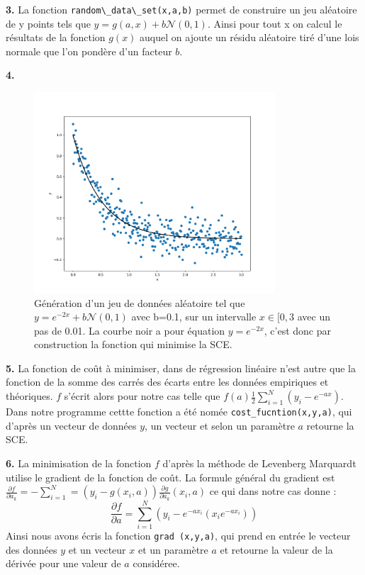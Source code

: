 \documentclass[12pt]{article}
\begin{document}
\textbf{\color{brick}3.} La fonction \verb|random\_data\_set(x,a,b)| permet de construire un jeu aléatoire de y points tels que  $y= g(a,x) +b \mathcal{N}(0,1)$. Ainsi pour tout x on calcul le résultats de la fonction $g(x)$ auquel on ajoute un résidu aléatoire tiré d'une lois normale que l'on pondère d'un facteur $b$.
\newpage

\textbf{\color{brick}4.} 
\begin{figure}[H]
\centering
\includegraphics[width=0.8\textwidth]{Q4.png}
\caption{Génération d'un jeu de données aléatoire tel que $y= e^{-2x} + b \mathcal{N}(0,1) $ avec b=0.1, sur un intervalle $x\in[0,3$ avec un pas de 0.01. La courbe noir a pour équation $y= e^{-2x}$, c'est donc par construction la fonction qui minimise la SCE. }
\label{Fig1}
\end{figure}

\textbf{\color{brick}5.} La fonction de coût à minimiser, dans de régression linéaire n'est autre que la fonction de la somme des carrés des écarts entre les données empiriques et théoriques. $f$ s'écrit alors  pour notre cas telle que $f(a) \frac{1}{2}\sum_{i=1}^N(y_i - e^{-ax}) $.  Dans notre programme cettte fonction a été nomée \verb|cost_fucntion(x,y,a)|, qui d'après un vecteur de données $y$, un vecteur et selon un paramètre $a$ retourne la SCE.


\textbf{\color{brick}6.} La minimisation de la fonction $f$ d'après la méthode de Levenberg Marquardt utilise le gradient de la fonction de coût. La formule général du gradient est \\
$\frac{\partial f}{\partial a_k} = - \sum_{i=1}^N = (y_i - g(x_i,a))\frac{\partial g}{\partial a_k}(x_i,a) $  ce qui dans notre cas donne :
$$ \frac{\partial f}{\partial a} =\sum_{i=1}^N (y_i - e^{-ax_i}(x_ie^{-ax_i})) $$
Ainsi nous avons écris la fonction \verb|grad (x,y,a)|, qui prend en entrée le vecteur des données $y$ et un vecteur $x$ et un paramètre $a$  et retourne la valeur de la dérivée  pour une valeur de $a$ considéree.
 
\end{document}
